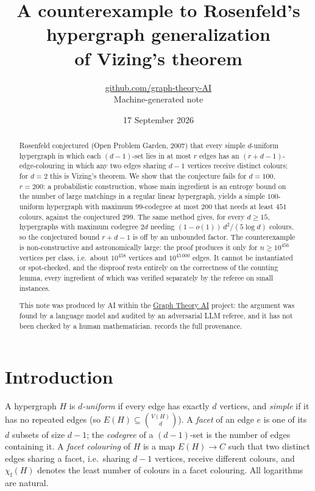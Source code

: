 \documentclass[11pt,a4paper]{article}
\title{A counterexample to Rosenfeld's hypergraph generalization\\ of Vizing's theorem}
\author{\href{https://github.com/graph-theory-AI}{github.com/graph-theory-AI}\\[2pt] \normalsize Machine-generated note}
\date{17 September 2026}
\theoremstyle{plain}
\theoremstyle{definition}
\theoremstyle{remark}
\newcommand{\chif}{\chi_{\mathrm{f}}}
\begin{document}
\maketitle

\begin{abstract}
Rosenfeld conjectured (Open Problem Garden, 2007) that every simple $d$-uniform hypergraph in which each $(d-1)$-set lies in at most $r$ edges has an $(r+d-1)$-edge-colouring in which any two edges sharing $d-1$ vertices receive distinct colours; for $d=2$ this is Vizing's theorem. We show that the conjecture fails for $d=100$, $r=200$: a probabilistic construction, whose main ingredient is an entropy bound on the number of large matchings in a regular linear hypergraph, yields a simple $100$-uniform hypergraph with maximum $99$-codegree at most $200$ that needs at least $451$ colours, against the conjectured $299$. The same method gives, for every $d\ge15$, hypergraphs with maximum codegree $2d$ needing $(1-o(1))\,d^2/(5\log d)$ colours, so the conjectured bound $r+d-1$ is off by an unbounded factor.
The counterexample is non-constructive and astronomically large: the proof produces it only for $n\ge10^{456}$ vertices per class, i.e.\ about $10^{458}$ vertices and $10^{45\,000}$ edges. It cannot be instantiated or spot-checked, and the disproof rests entirely on the correctness of the counting lemma, every ingredient of which was verified separately by the referee on small instances.

\medskip\noindent\small
This note was produced by AI within the \href{https://github.com/graph-theory-AI/Graph-Theory-LLM-Proofs}{Graph Theory AI} project:
the argument was found by a language model and audited by an adversarial LLM
referee, and it has not been checked by a human mathematician.
 records the full provenance.
\end{abstract}

\section{Introduction}

A hypergraph $H$ is \emph{$d$-uniform} if every edge has exactly $d$ vertices, and \emph{simple} if it has no repeated edges (so $E(H)\subseteq\binom{V(H)}{d}$). A \emph{facet} of an edge $e$ is one of its $d$ subsets of size $d-1$; the \emph{codegree} of a $(d-1)$-set is the number of edges containing it. A \emph{facet colouring} of $H$ is a map $E(H)\to C$ such that two distinct edges sharing a facet, i.e.\ sharing $d-1$ vertices, receive different colours, and $\chif(H)$ denotes the least number of colours in a facet colouring. All logarithms are natural.
\end{document}
